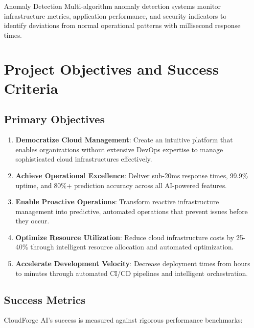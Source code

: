 \begin{featurebox}{Anomaly Detection}
Multi-algorithm anomaly detection systems monitor infrastructure metrics, application performance, and security indicators to identify deviations from normal operational patterns with millisecond response times.
\end{featurebox}

\section{Project Objectives and Success Criteria}

\subsection{Primary Objectives}

\begin{enumerate}[leftmargin=*]
    \item \textbf{Democratize Cloud Management}: Create an intuitive platform that enables organizations without extensive DevOps expertise to manage sophisticated cloud infrastructures effectively.
    
    \item \textbf{Achieve Operational Excellence}: Deliver sub-20ms response times, 99.9\% uptime, and 80\%+ prediction accuracy across all AI-powered features.
    
    \item \textbf{Enable Proactive Operations}: Transform reactive infrastructure management into predictive, automated operations that prevent issues before they occur.
    
    \item \textbf{Optimize Resource Utilization}: Reduce cloud infrastructure costs by 25-40\% through intelligent resource allocation and automated optimization.
    
    \item \textbf{Accelerate Development Velocity}: Decrease deployment times from hours to minutes through automated CI/CD pipelines and intelligent orchestration.
\end{enumerate}

\subsection{Success Metrics}

CloudForge AI's success is measured against rigorous performance benchmarks:

